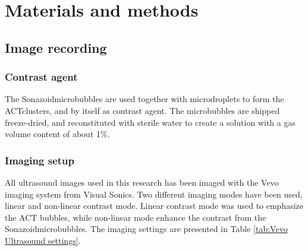 \section{Materials and methods}
\subsection{Image recording}
\subsubsection{Contrast agent}

The Sonazoid\texttrademark microbubbles are used together with microdroplets to form the ACT\texttrademark clusters, and by itself as contrast agent. The microbubbles are shipped freeze-dried, and reconstituted with sterile water to create a solution with a gas volume content of about 1\%. %

\subsubsection{Imaging setup}
All ultrasound images used in this research has been imaged with the Vevo imaging system from Visual Sonics.
Two different imaging modes have been used, linear and non-linear contrast mode. Linear contrast mode was used to emphasize the ACT bubbles, while non-linear mode enhance the contrast from the Sonazoid\texttrademark microbubbles. The imaging settings are presented in Table \ref{tab:Vevo Ultrasound settings}.

